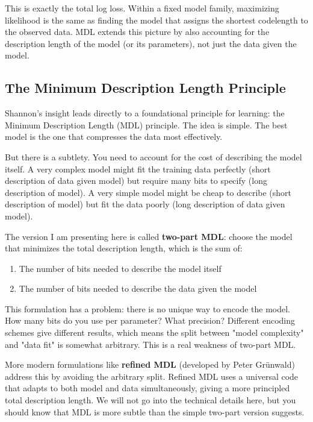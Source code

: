 This is exactly the total log loss. Within a fixed model family, maximizing likelihood is the same as finding the model that assigns the shortest codelength to the observed data. MDL extends this picture by also accounting for the description length of the model (or its parameters), not just the data given the model.

\subsection{The Minimum Description Length Principle}

Shannon's insight leads directly to a foundational principle for learning: the Minimum Description Length (MDL) principle. The idea is simple. The best model is the one that compresses the data most effectively.

But there is a subtlety. You need to account for the cost of describing the model itself. A very complex model might fit the training data perfectly (short description of data given model) but require many bits to specify (long description of model). A very simple model might be cheap to describe (short description of model) but fit the data poorly (long description of data given model).

The version I am presenting here is called \textbf{two-part MDL}: choose the model that minimizes the total description length, which is the sum of:

\begin{enumerate}
\item The number of bits needed to describe the model itself
\item The number of bits needed to describe the data given the model
\end{enumerate}

This formulation has a problem: there is no unique way to encode the model. How many bits do you use per parameter? What precision? Different encoding schemes give different results, which means the split between "model complexity" and "data fit" is somewhat arbitrary. This is a real weakness of two-part MDL.

More modern formulations like \textbf{refined MDL} (developed by Peter Grünwald) address this by avoiding the arbitrary split. Refined MDL uses a universal code that adapts to both model and data simultaneously, giving a more principled total description length. We will not go into the technical details here, but you should know that MDL is more subtle than the simple two-part version suggests.

